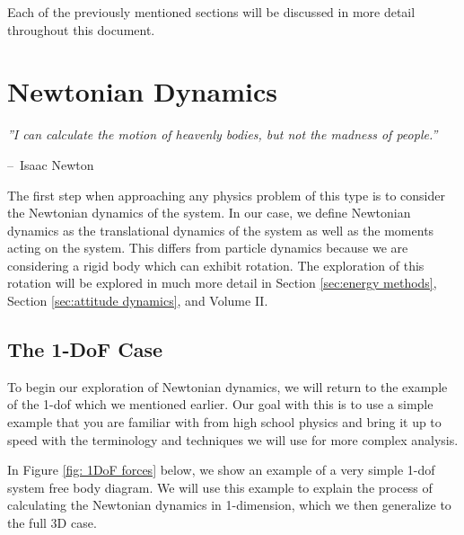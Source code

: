 \documentclass[12pt]{report}
\makeatletter
\newenvironment{chapquote}[2][2em]
  {\setlength{\@tempdima}{#1}%
   \def\chapquote@author{#2}%
   \parshape 1 \@tempdima \dimexpr\textwidth-2\@tempdima\relax%
   \itshape}
  {\par\normalfont\hfill--\ \chapquote@author\hspace*{\@tempdima}\par\bigskip}
\makeatother
\begin{document}
Each of the previously mentioned sections will be discussed in more detail throughout this document.

\chapter{Newtonian Dynamics}\label{sec: Newtonian Dynamics}
\begin{chapquote}{Isaac Newton}
''I can calculate the motion of heavenly bodies, but not the madness of people.''
\end{chapquote}
The first step when approaching any physics problem of this type is to consider the Newtonian dynamics of the system. In our case, we define Newtonian dynamics as the translational dynamics of the system as well as the moments acting on the system. This differs from particle dynamics because we are considering a rigid body which can exhibit rotation. The exploration of this rotation will be explored in much more detail in Section \ref{sec:energy methods}, Section \ref{sec:attitude dynamics}, and Volume II. 
\section{The 1-DoF Case}\label{sec: The 1DoF Case}
To begin our exploration of Newtonian dynamics, we will return to the example of the 1-\gls{dof} which we mentioned earlier. Our goal with this is to use a simple example that you are familiar with from high school physics and bring it up to speed with the terminology and techniques we will use for more complex analysis.

In Figure \ref{fig: 1DoF forces} below, we show an example of a very simple 1-\gls{dof} system free body diagram. We will use this example to explain the process of calculating the Newtonian dynamics in 1-dimension, which we then generalize to the full 3D case. 

\end{document}
